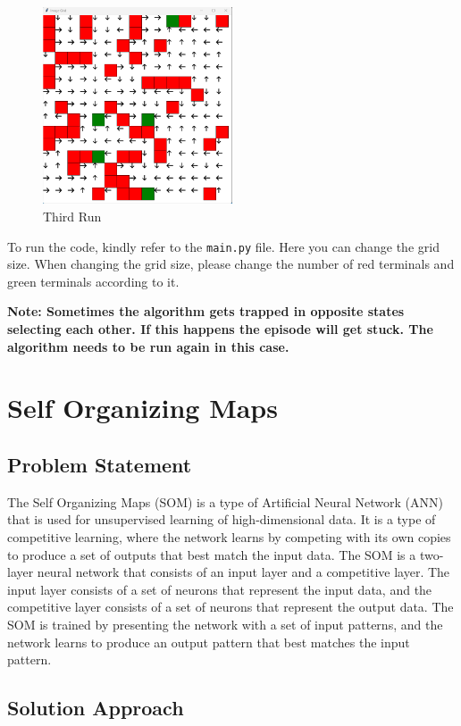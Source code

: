\documentclass{article}
\begin{document}
\begin{figure}[H]
  \centering
  \includegraphics[width=0.5\textwidth, height=0.3\textheight]{grid_3.png}
  \caption{Third Run}
\end{figure}

To run the code, kindly refer to the \texttt{main.py} file. Here you can change the grid size. When changing the grid size, please change the number of red terminals and green terminals according to it. 

\textbf{Note: Sometimes the algorithm gets trapped in opposite states selecting each other. If this happens the episode will get stuck. The algorithm needs to be run again in this case.}

\section{Self Organizing Maps}

\subsection{Problem Statement}
The Self Organizing Maps (SOM) is a type of Artificial Neural Network (ANN) that is used for unsupervised learning of high-dimensional data. It is a type of competitive learning, where the network learns by competing with its own copies to produce a set of outputs that best match the input data.
The SOM is a two-layer neural network that consists of an input layer and a competitive layer. The input layer consists of a set of neurons that represent the input data, and the competitive layer consists of a set of neurons that represent the output data. The SOM is trained by presenting the network with a set of input patterns, and the network learns to produce an output pattern that best matches the input pattern.

\subsection{Solution Approach}
\end{document}
